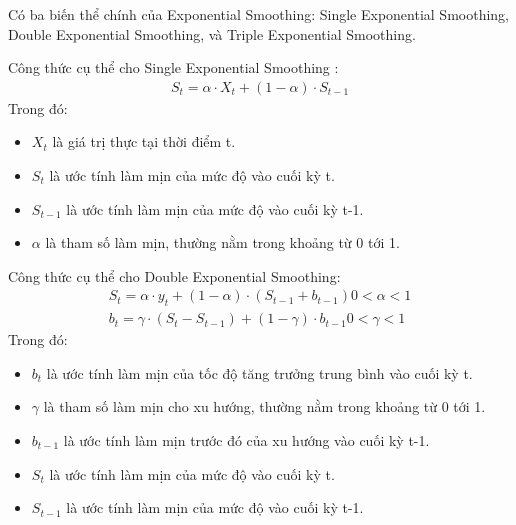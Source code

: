 \documentclass[conference]{IEEEtran}
\begin{document}
Có ba biến thể chính của Exponential Smoothing: Single Exponential Smoothing, Double Exponential Smoothing, và Triple Exponential Smoothing.

Công thức cụ thể cho Single Exponential Smoothing \cite{HoltWinter2}:
\begin{align*}
S_t = \alpha \cdot X_t + (1 - \alpha) \cdot S_{t-1}
\end{align*}
Trong đó:
\begin{itemize}
    \item $X_t$ là giá trị thực tại thời điểm t.
    \item $S_t$ là ước tính làm mịn của mức độ vào cuối kỳ t.
    \item $S_{t-1}$ là ước tính làm mịn của mức độ vào cuối kỳ t-1.
    \item $\alpha$ là tham số làm mịn, thường nằm trong khoảng từ 0 tới 1.
\end{itemize}

Công thức cụ thể cho Double Exponential Smoothing:
\begin{align*}
S_t = \alpha \cdot y_t + (1 - \alpha) \cdot (S_{t-1} + b_{t-1}) 0 < α < 1
\\
b_t = \gamma \cdot (S_t - S_{t-1}) + (1 - \gamma) \cdot b_{t-1} 0 < γ < 1 
\end{align*}
Trong đó:
\begin{itemize}
    \item $b_t$ là ước tính làm mịn của tốc độ tăng trưởng trung bình vào cuối kỳ t.
    \item $\gamma$ là tham số làm mịn cho xu hướng, thường nằm trong khoảng từ 0 tới 1.
    \item $b_{t-1}$ là ước tính làm mịn trước đó của xu hướng vào cuối kỳ t-1.
    \item $S_t$ là ước tính làm mịn của mức độ vào cuối kỳ t.
    \item $S_{t-1}$ là ước tính làm mịn của mức độ vào cuối kỳ t-1.
\end{itemize}
\end{document}

